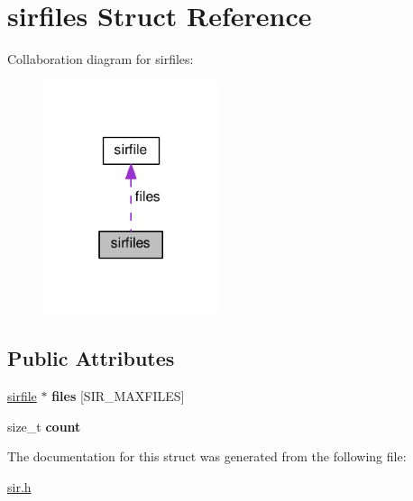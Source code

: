 \hypertarget{structsirfiles}{}\section{sirfiles Struct Reference}
\label{structsirfiles}


Collaboration diagram for sirfiles\+:\nopagebreak
\begin{figure}[H]
\begin{center}
\leavevmode
\includegraphics[width=146pt]{structsirfiles__coll__graph}
\end{center}
\end{figure}
\subsection*{Public Attributes}
\begin{DoxyCompactItemize}
\item 
\hyperlink{structsirfile}{sirfile} $\ast$ {\bfseries files} \mbox{[}S\+I\+R\+\_\+\+M\+A\+X\+F\+I\+L\+ES\mbox{]}\hypertarget{structsirfiles_a579fb2dd046c2be0d09b7b15ea8de108}{}\label{structsirfiles_a579fb2dd046c2be0d09b7b15ea8de108}

\item 
size\+\_\+t {\bfseries count}\hypertarget{structsirfiles_a248c0274e45ac4dcc766e90e843d7c7b}{}\label{structsirfiles_a248c0274e45ac4dcc766e90e843d7c7b}

\end{DoxyCompactItemize}


The documentation for this struct was generated from the following file\+:\begin{DoxyCompactItemize}
\item 
\hyperlink{sir_8h}{sir.\+h}\end{DoxyCompactItemize}
